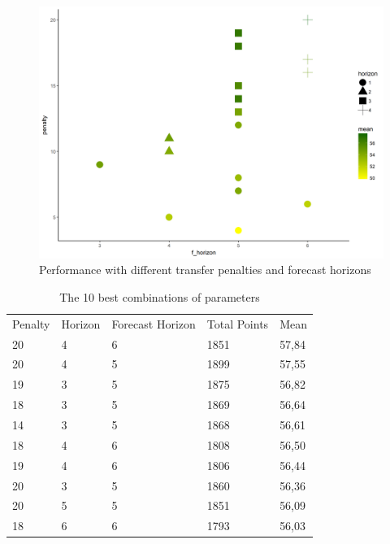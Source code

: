 \begin{figure}[H]
    \centering
    \includegraphics[scale=0.55]{fig/chapter_6/paramter_choice.png}
    \caption{Performance with different transfer penalties and forecast horizons}
\label{Parameter_choice}    
\end{figure}

\begin{table}[H]
\centering
\caption{The 10 best combinations of parameters}
\label{tab:top_10}
\begin{tabular}{lllll}
Penalty & Horizon & Forecast Horizon & Total Points & Mean  \\
20      & 4       & 6                & 1851         & 57,84 \\
20      & 4       & 5                & 1899         & 57,55 \\
19      & 3       & 5                & 1875         & 56,82 \\
18      & 3       & 5                & 1869         & 56,64 \\
14      & 3       & 5                & 1868         & 56,61 \\
18      & 4       & 6                & 1808         & 56,50 \\
19      & 4       & 6                & 1806         & 56,44 \\
20      & 3       & 5                & 1860         & 56,36 \\
20      & 5       & 5                & 1851         & 56,09 \\
18      & 6       & 6                & 1793         & 56,03
\end{tabular}
\end{table}

